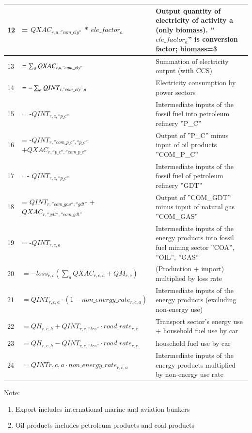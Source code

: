 \documentclass[10pt,a4paper,titlepage,dvipdfmx]{book}
\begin{document}
\begin{tabularx}{\textwidth}{|
p{}|
p{}|
p{}|}
12 & = $QXAC_{r,a,''com\_ely''}$ * $ele\_factor_{a}$ & Output quantity of electricity of activity a (only biomass). ''$ele\_factor_{a}$'' is conversion factor; biomass=3 \\\hline 
13 & $=\sum _{a}QXAC_{r,a,"com\_ ely"}$ & Summation of electricity output (with CCS) \\\hline 
14 & $=-\sum _{a}QINT_{r,"com\_ ely",a}$ & Electricity consumption by power sectors \\\hline 
15 & = -$QINT_{r,c,''p\_c''}$ & Intermediate inputs of the fossil fuel into petroleum refinery ''P\_C'' \\\hline 
16 & = -$QINT_{r, ''com\_p\_c'', ''p\_c''}$ $+QXAC_{r,''p\_c'',''com\_p\_c''}$ & Output of ''P\_C'' minus input of oil products ''COM\_P\_C'' \\\hline 
17 & =- $QINT_{r,c, ''p\_c''}$ & Intermediate inputs of the fossil fuel of petroleum refinery ''GDT'' \\\hline 
18 & = $QINT_{r,''com\_gas'',''gdt''}$ + $QXAC_{r, ''gdt'',''com\_gdt''}$ & Output of ''COM\_GDT'' minus input of natural gas ''COM\_GAS'' \\\hline 
19 & = -$QINT_{r,c,a}$ & Intermediate inputs of the energy products into fossil fuel mining sector ''COA'', ''OIL'', ''GAS'' \\\hline 
20 & $=-loss_{r,c}(\sum _{a}QXAC_{r,c,a}+QM_{r,c})$ & (Production + import) multiplied by loss rate \\\hline 
21 & $= QINT_{r,c,a}\cdot (1-non\_energy\_rate_{r,c,a})$ & Intermediate inputs of the energy products (excluding non-energy use) \\\hline 
22 & $= QH_{r,c,h}+ QINT_{r,c,''trs''} \cdot road\_rate_{r,c}$ & Transport sector's energy use + household fuel use by car  \\\hline 
23 & $= QH_{r,c,h}- QINT_{r,c,''trs''} \cdot road\_rate_{r,c}$ & household fuel use by car \\\hline 
24 & $= QINT{r,c,a}\cdot non\_energy\_rate_{r,c,a}$ & Intermediate inputs of the energy products multiplied by non-energy use rate \\\hline 
\end{tabularx}

Note:
\begin{enumerate}
\item Export includes international marine and aviation bunkers
\item Oil products includes petroleum products and coal products 
\end{enumerate}
\end{document}
